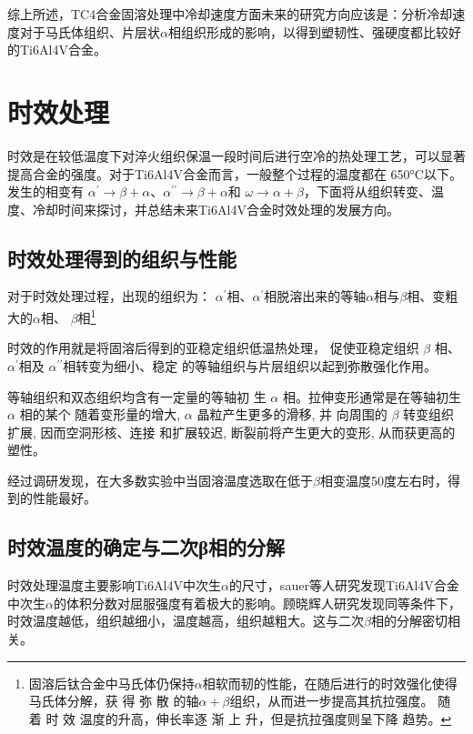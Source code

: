 \documentclass[
class = book,
zihao = -4,
font = noto,
paper = a4paper,
openany
]{easybook}
\newcommand{\ti}{Ti6Al4V}
\begin{document}
综上所述，TC4合金固溶处理中冷却速度方面未来的研究方向应该是：分析冷却速度对于马氏体组织、片层状$ \alpha $相组织形成的影响，以得到塑韧性、强硬度都比较好的\ti 合金。
\chapter{时效处理}
时效是在较低温度下对淬火组织保温一段时间后进行空冷的热处理工艺，可以显著提高合金的强度。对于\ti 合金而言，一般整个过程的温度都在 650°C以下。发生的相变有 $ \alpha  ^{\prime}\to \beta+\alpha$、$ \alpha  ^{\prime\prime}\to\beta+\alpha$和 $\omega\to \alpha+\beta$，下面将从组织转变、温度、冷却时间来探讨，并总结未来\ti 合金时效处理的发展方向。
\section{时效处理得到的组织与性能}
对于时效处理过程，出现的组织为\cite{zhanghaoyinGurongShixiaoduiTC4taihejinzuzhihelixuexingnengdeyingxiang2014}： $ \alpha  ^{\prime}$相、$ \alpha  ^{\prime}$相脱溶出来的等轴$ \alpha$相与$ \beta $相、变粗大的$ \alpha $相、 $ \beta $相\footnote{固溶后钛合金中马氏体仍保持$ \alpha $相软而韧的性能，在随后进行的时效强化使得马氏体分解，获 得 弥 散 的轴$ \alpha+\beta $组织，从而进一步提高其抗拉强度。 随 着 时 效 温度的升高，伸长率逐 渐 上 升，但是抗拉强度则呈下降 趋势。}

时效的作用就是将固溶后得到的亚稳定组织低温热处理， 促使亚稳定组织 $\beta$ 相、$ \alpha  ^{\prime}$相及 $ \alpha  ^{\prime\prime}$相转变为细小、稳定 的等轴组织与片层组织以起到弥散强化作用。

等轴组织和双态组织均含有一定量的等轴初 生 $\alpha$ 相。拉伸变形通常是在等轴初生 $\alpha$ 相的某个 随着变形量的增大, $\alpha$ 晶粒产生更多的滑移, 并 向周围的 $\beta$ 转变组织扩展, 因而空洞形核、连接 和扩展较迟, 断裂前将产生更大的变形, 从而获更高的塑性\cite{yekangyuanRechuliduiTC4taihejinduanjianzuzhihexingnengdeyingxiang2022}。


经过调研发现，在大多数实验中当固溶温度选取在低于$ \beta $相变温度50度左右时，得到的性能最好。

\section{时效温度的确定与二次β相的分解}
时效处理温度主要影响\ti 中次生$ \alpha $的尺寸，sauer\cite{sauerThermomechanicalProcessingHigh2001}等人研究发现\ti 合金中次生$ \alpha  $的体积分数对屈服强度有着极大的影响。顾晓辉\cite{guxiaohuiCuihuoShixiaowenduduiTC4taihejinzuzhihelixuexingnengdeyingxiang2011}人研究发现同等条件下，时效温度越低，组织越细小，温度越高，组织越粗大。这与二次$ \beta $相的分解密切相关。
\end{document}
